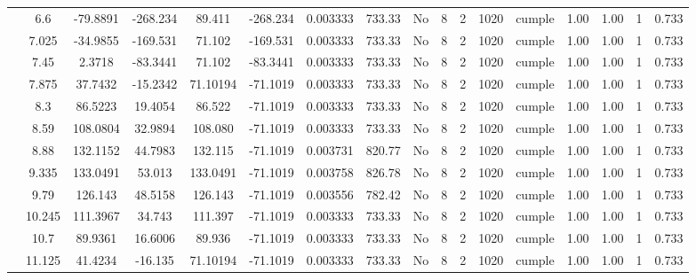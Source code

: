 \begin{table}[H]
{\begin{tabular}{|c|c|c|c|c|c|c|c|c|c|c|c|c|c|c|c|c|}
\cline{2-17}    & 6.6 & -79.8891 & -268.234 & 89.411 & -268.234 & 0.003333 & 733.33 & No  & 8   & 2   & 1020 & \cellcolor[rgb]{ .776,  .937,  .808}cumple & 1.00 & 1.00 & 1   & 0.733 \bigstrut\\
\cline{2-17}    & 7.025 & -34.9855 & -169.531 & 71.102 & -169.531 & 0.003333 & 733.33 & No  & 8   & 2   & 1020 & \cellcolor[rgb]{ .776,  .937,  .808}cumple & 1.00 & 1.00 & 1   & 0.733 \bigstrut\\
\cline{2-17}    & 7.45 & 2.3718 & -83.3441 & 71.102 & -83.3441 & 0.003333 & 733.33 & No  & 8   & 2   & 1020 & \cellcolor[rgb]{ .776,  .937,  .808}cumple & 1.00 & 1.00 & 1   & 0.733 \bigstrut\\
\cline{2-17}    & 7.875 & 37.7432 & -15.2342 & 71.10194 & -71.1019 & 0.003333 & 733.33 & No  & 8   & 2   & 1020 & \cellcolor[rgb]{ .776,  .937,  .808}cumple & 1.00 & 1.00 & 1   & 0.733 \bigstrut\\
\cline{2-17}    & 8.3 & 86.5223 & 19.4054 & 86.522 & -71.1019 & 0.003333 & 733.33 & No  & 8   & 2   & 1020 & \cellcolor[rgb]{ .776,  .937,  .808}cumple & 1.00 & 1.00 & 1   & 0.733 \bigstrut\\
\cline{2-17}    & 8.59 & 108.0804 & 32.9894 & 108.080 & -71.1019 & 0.003333 & 733.33 & No  & 8   & 2   & 1020 & \cellcolor[rgb]{ .776,  .937,  .808}cumple & 1.00 & 1.00 & 1   & 0.733 \bigstrut\\
\cline{2-17}    & 8.88 & 132.1152 & 44.7983 & 132.115 & -71.1019 & 0.003731 & 820.77 & No  & 8   & 2   & 1020 & \cellcolor[rgb]{ .776,  .937,  .808}cumple & 1.00 & 1.00 & 1   & 0.733 \bigstrut\\
\cline{2-17}    & 9.335 & 133.0491 & 53.013 & 133.0491 & -71.1019 & 0.003758 & 826.78 & No  & 8   & 2   & 1020 & \cellcolor[rgb]{ .776,  .937,  .808}cumple & 1.00 & 1.00 & 1   & 0.733 \bigstrut\\
\cline{2-17}    & 9.79 & 126.143 & 48.5158 & 126.143 & -71.1019 & 0.003556 & 782.42 & No  & 8   & 2   & 1020 & \cellcolor[rgb]{ .776,  .937,  .808}cumple & 1.00 & 1.00 & 1   & 0.733 \bigstrut\\
\cline{2-17}    & 10.245 & 111.3967 & 34.743 & 111.397 & -71.1019 & 0.003333 & 733.33 & No  & 8   & 2   & 1020 & \cellcolor[rgb]{ .776,  .937,  .808}cumple & 1.00 & 1.00 & 1   & 0.733 \bigstrut\\
\cline{2-17}    & 10.7 & 89.9361 & 16.6006 & 89.936 & -71.1019 & 0.003333 & 733.33 & No  & 8   & 2   & 1020 & \cellcolor[rgb]{ .776,  .937,  .808}cumple & 1.00 & 1.00 & 1   & 0.733 \bigstrut\\
\cline{2-17}    & 11.125 & 41.4234 & -16.135 & 71.10194 & -71.1019 & 0.003333 & 733.33 & No  & 8   & 2   & 1020 & \cellcolor[rgb]{ .776,  .937,  .808}cumple & 1.00 & 1.00 & 1   & 0.733 \bigstrut\\

\end{tabular}}
\end{table}
